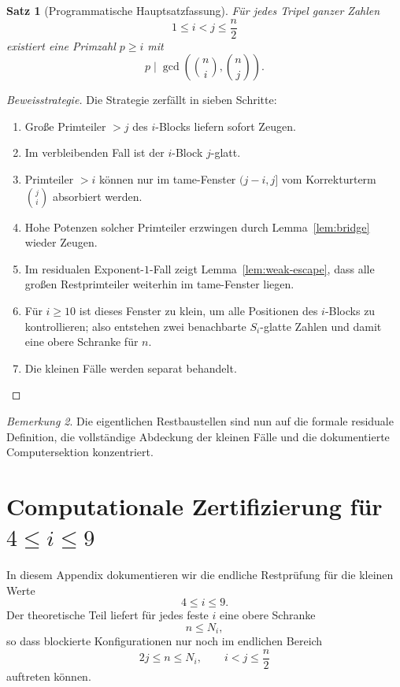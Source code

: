 \documentclass[12pt,a4paper]{article}
\theoremstyle{plain}
\newtheorem{theorem}{Satz}[section]
\theoremstyle{definition}
\theoremstyle{remark}
\newtheorem{remark}[theorem]{Bemerkung}
\begin{document}
	\begin{theorem}[Programmatische Hauptsatzfassung]
		\label{thm:programmatic-main}
		Für jedes Tripel ganzer Zahlen
		\[
		1\le i<j\le \frac n2
		\]
		existiert eine Primzahl \(p\ge i\) mit
		\[
		p\mid \gcd\!\left(\binom ni,\binom nj\right).
		\]
	\end{theorem}
	
	\begin{proof}[Beweisstrategie]
		Die Strategie zerfällt in sieben Schritte:
		\begin{enumerate}[label=\arabic*)]
			\item Große Primteiler \(>j\) des \(i\)-Blocks liefern sofort Zeugen.
			\item Im verbleibenden Fall ist der \(i\)-Block \(j\)-glatt.
			\item Primteiler \(>i\) können nur im tame-Fenster \((j-i,j]\) vom Korrekturterm \(\binom ji\) absorbiert werden.
			\item Hohe Potenzen solcher Primteiler erzwingen durch Lemma~\ref{lem:bridge} wieder Zeugen.
			\item Im residualen Exponent-\(1\)-Fall zeigt Lemma~\ref{lem:weak-escape}, dass alle großen Restprimteiler weiterhin im tame-Fenster liegen.
			\item Für \(i\ge10\) ist dieses Fenster zu klein, um alle Positionen des \(i\)-Blocks zu kontrollieren; also entstehen zwei benachbarte \(S_i\)-glatte Zahlen und damit eine obere Schranke für \(n\).
			\item Die kleinen Fälle werden separat behandelt.
		\end{enumerate}
	\end{proof}
	
	\begin{remark}
		Die eigentlichen Restbaustellen sind nun auf die formale residuale Definition, die vollständige Abdeckung der kleinen Fälle und die dokumentierte Computersektion konzentriert.
	\end{remark}
	
	\appendix
	
	\section{Computationale Zertifizierung für \(4\le i\le 9\)}
	
	In diesem Appendix dokumentieren wir die endliche Restprüfung für die kleinen Werte
	\[
	4\le i\le 9.
	\]
	Der theoretische Teil liefert für jedes feste \(i\) eine obere Schranke
	\[
	n\le N_i,
	\]
	so dass blockierte Konfigurationen nur noch im endlichen Bereich
	\[
	2j\le n\le N_i,\qquad i<j\le \frac n2
	\]
	auftreten können.
	
\end{document}
